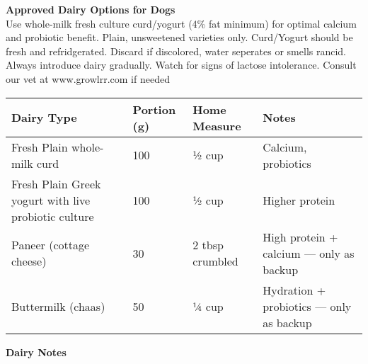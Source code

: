 \vspace{6mm}

\begin{flushleft}
\textbf{Approved Dairy Options for Dogs}\\[4pt]
Use whole-milk  fresh culture curd/yogurt (4\% fat minimum) for optimal calcium and probiotic benefit. 
Plain, unsweetened varieties only.
Curd/Yogurt should be fresh and refridgerated. Discard if discolored, water seperates or smells rancid. 
Always introduce dairy gradually. Watch for signs of lactose intolerance. Consult our vet at www.growlrr.com if needed

\end{flushleft}

\vspace{3mm}

\begin{tabular}{@{} l l l p{7cm} @{}}
\toprule
\textbf{Dairy Type} & \textbf{Portion (g)} & \textbf{Home Measure} & \textbf{Notes}\\
\midrule
Fresh Plain whole-milk curd & 100 & ½ cup & Calcium, probiotics\\[3pt]
Fresh Plain Greek yogurt with live probiotic culture & 100 & ½ cup & Higher protein\\[3pt]
Paneer (cottage cheese) & 30 & 2 tbsp crumbled & High protein + calcium --- only as backup\\[3pt]
Buttermilk (chaas) & 50 & ¼ cup & Hydration + probiotics --- only as backup\\[3pt]
\bottomrule
\end{tabular}

\vspace{4mm}

\begin{flushleft}
\textbf{Dairy Notes}\\[2pt]



\end{flushleft}



